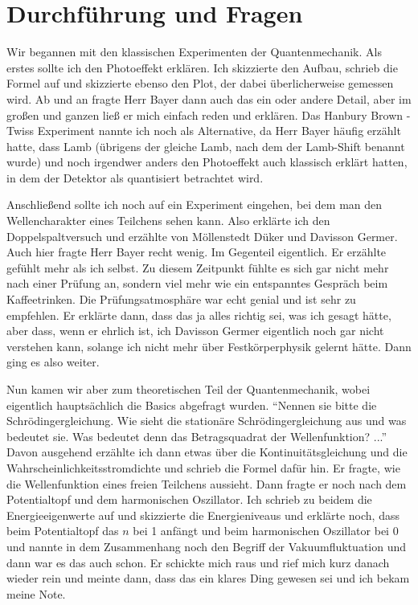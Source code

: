 \section{Durchführung und Fragen}


\noindent Wir begannen mit den klassischen Experimenten der Quantenmechanik. Als erstes sollte ich den Photoeffekt erklären. 
Ich skizzierte den Aufbau, schrieb die Formel auf und skizzierte ebenso den Plot, der dabei überlicherweise gemessen wird.
Ab und an fragte Herr Bayer dann auch das ein oder andere Detail, aber im großen und ganzen ließ er mich einfach reden und erklären. 
Das Hanbury Brown - Twiss Experiment nannte ich noch als Alternative, da Herr Bayer häufig erzählt hatte, dass Lamb (übrigens der gleiche Lamb, nach dem der Lamb-Shift benannt wurde) und noch irgendwer anders den Photoeffekt auch klassisch erklärt hatten, in dem der Detektor als quantisiert betrachtet wird. 

\noindent Anschließend sollte ich noch auf ein Experiment eingehen, bei dem man den Wellencharakter eines Teilchens sehen kann. Also erklärte ich den Doppelspaltversuch und erzählte von Möllenstedt Düker und Davisson Germer. Auch hier fragte Herr Bayer recht wenig. Im Gegenteil eigentlich. Er erzählte gefühlt mehr als ich selbst. Zu diesem Zeitpunkt fühlte es sich gar nicht mehr nach einer Prüfung an, sondern viel mehr wie ein entspanntes Gespräch beim Kaffeetrinken. Die Prüfungsatmosphäre war echt genial und ist sehr zu empfehlen. Er erklärte dann, dass das ja alles richtig sei, was ich gesagt hätte, aber dass, wenn er ehrlich ist, ich Davisson Germer eigentlich noch gar nicht verstehen kann, solange ich nicht mehr über Festkörperphysik gelernt hätte. Dann ging es also weiter. 

\noindent Nun kamen wir aber zum theoretischen Teil der Quantenmechanik, wobei eigentlich hauptsächlich die Basics abgefragt wurden. \enquote{Nennen sie bitte die Schrödingergleichung. Wie sieht die stationäre Schrödingergleichung aus und was bedeutet sie. Was bedeutet denn das Betragsquadrat der Wellenfunktion? ...} Davon ausgehend erzählte ich dann etwas über die Kontinuitätsgleichung und die Wahrscheinlichkeitsstromdichte und schrieb die Formel dafür hin. Er fragte, wie die Wellenfunktion eines freien Teilchens aussieht. Dann fragte er noch nach dem Potentialtopf und dem harmonischen Oszillator. Ich schrieb zu beidem die Energieeigenwerte auf und skizzierte die Energieniveaus und erklärte noch, dass beim Potentialtopf das $n$ bei \num{1} anfängt und beim harmonischen Oszillator bei \num{0} und nannte in dem Zusammenhang noch den Begriff der Vakuumfluktuation und dann war es das auch schon. Er schickte mich raus und rief mich kurz danach wieder rein und meinte dann, dass das ein klares Ding gewesen sei und ich bekam meine Note.


